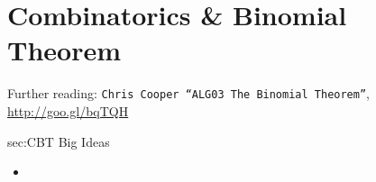 \chapter{Combinatorics \& Binomial Theorem}
\label{chap:CBT}

Further reading: \texttt{Chris Cooper ``ALG03 The Binomial Theorem''}, \url{http://goo.gl/bqTQH}

\begin{bigideas}{sec:CBT Big Ideas}
\begin{itemize}
  \item   
\end{itemize}
\end{bigideas}